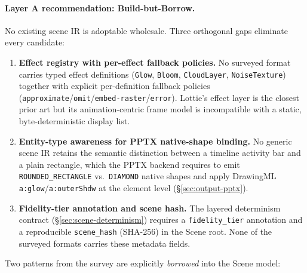 \paragraph{Layer A recommendation: Build-but-Borrow.}
No existing scene IR is adoptable wholesale.
Three orthogonal gaps eliminate every candidate:

\begin{enumerate}
  \item \textbf{Effect registry with per-effect fallback policies.}
        No surveyed format carries typed effect definitions (\texttt{Glow},
        \texttt{Bloom}, \texttt{CloudLayer}, \texttt{NoiseTexture}) together with
        explicit per-definition fallback policies
        (\texttt{approximate}/\texttt{omit}/\texttt{embed-raster}/\texttt{error}).
        Lottie's effect layer is the closest prior art but its animation-centric
        frame model is incompatible with a static, byte-deterministic display list.

  \item \textbf{Entity-type awareness for PPTX native-shape binding.}
        No generic scene IR retains the semantic distinction between a timeline
        activity bar and a plain rectangle, which the PPTX backend requires to emit
        \texttt{ROUNDED\_RECTANGLE} vs.\ \texttt{DIAMOND} native shapes and apply
        DrawingML \texttt{a:glow}/\texttt{a:outerShdw} at the element level
        (\S\ref{sec:output-pptx}).

  \item \textbf{Fidelity-tier annotation and scene hash.}
        The layered determinism contract (\S\ref{sec:scene-determinism}) requires a
        \texttt{fidelity\_tier} annotation and a reproducible \texttt{scene\_hash}
        (SHA-256) in the Scene root. None of the surveyed formats carries these
        metadata fields.
\end{enumerate}

Two patterns from the survey are explicitly \emph{borrowed} into the Scene model:

